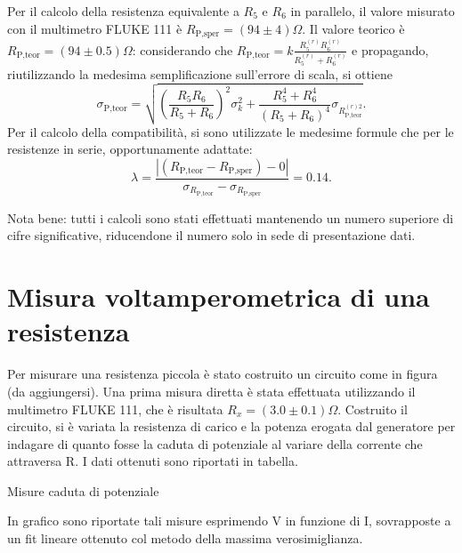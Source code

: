 \documentclass[11pt,a4paper]{article} %
\begin{document}
{Per il calcolo della resistenza equivalente a $R_5$ e $R_6$ in parallelo, il valore misurato con il multimetro FLUKE 111 \`e $R_{\textrm{P,sper}}= (94 \pm 4) \Omega$.
Il valore teorico \`e $R_{\textrm{P,teor}}=(94 \pm 0.5) \Omega$: considerando che $R_{\textrm{P,teor}}=k  \frac{R_5^{(r)} R_6^{(r)}}{R_5^{(r)} + R_6^{(r)}}$ e propagando, riutilizzando la medesima semplificazione sull'errore di scala, si ottiene 
\[\sigma_{\textrm{P,teor}}=\sqrt{\left(\frac{R_5 R_6}{R_5+R_6}\right)^2 \sigma_k^2 + \frac{R_5^4 + R_6^4}{(R_5 + R_6)^4}  \sigma_{R_{\textrm{P,teor}}^{(r) 2}}} .\]
Per il calcolo della compatibilit\`a, si sono utilizzate le medesime formule che per le resistenze in serie, opportunamente adattate:
\[\lambda=
	\frac{ \left|(R_{\textrm{P,teor}}-R_{\textrm{P,sper}})-0 \right| } { \sigma_{R_{\textrm{P,teor}}}-\sigma_{R_{\textrm{P,sper}}}}=0.14.\] 

Nota bene: tutti i calcoli sono stati effettuati mantenendo un numero superiore di cifre significative, riducendone il numero solo in sede di presentazione dati.



 











\section{Misura voltamperometrica di una resistenza}
Per misurare una resistenza piccola \`e stato costruito un circuito come in figura (da aggiungersi). Una prima misura diretta \`e stata effettuata utilizzando il multimetro FLUKE 111, che \`e risultata $R_x=(3.0 \pm 0.1) \Omega$.
Costruito il circuito, si \`e variata la resistenza di carico e la potenza erogata dal generatore per indagare di quanto fosse la caduta di potenziale al variare della corrente che attraversa R. I dati ottenuti sono riportati in tabella. 

\begin{tabella}
	\centering
	
	\caption{Misure caduta di potenziale}
	\label{tab:02_tab_1.tex}
\end{tabella}

In grafico sono riportate tali misure esprimendo V in funzione di I, sovrapposte a un fit lineare ottenuto col metodo della massima verosimiglianza.

}
\end{document}
